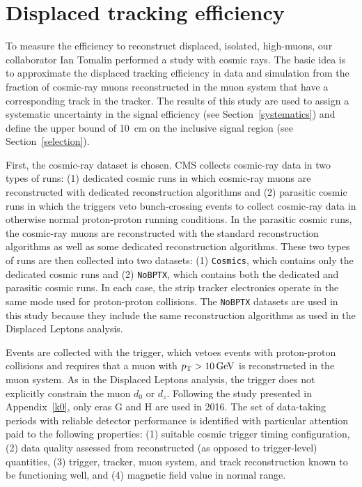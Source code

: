\chapter{Displaced tracking efficiency}
\label{displaced_tracking_eff}
To measure the efficiency to reconstruct displaced, isolated, high-\pt muons, our collaborator Ian Tomalin performed a study with cosmic rays. The basic idea is to approximate the displaced tracking efficiency in data and simulation from the fraction of cosmic-ray muons reconstructed in the muon system that have a corresponding track in the tracker. The results of this study are used to assign a systematic uncertainty in the signal efficiency (see Section~\ref{systematics}) and define the upper bound of \SI{10}{\cm} on the inclusive signal region (see Section~\ref{selection}).

First, the cosmic-ray dataset is chosen. CMS collects cosmic-ray data in two types of runs: (1) dedicated cosmic runs in which cosmic-ray muons are reconstructed with dedicated reconstruction algorithms and (2) parasitic cosmic runs in which the triggers veto bunch-crossing events to collect cosmic-ray data in otherwise normal proton-proton running conditions. In the parasitic cosmic runs, the cosmic-ray muons are reconstructed with the standard reconstruction algorithms as well as some dedicated reconstruction algorithms. These two types of runs are then collected into two datasets: (1) \texttt{Cosmics}, which contains only the dedicated cosmic runs and (2) \texttt{NoBPTX}, which contains both the dedicated and parasitic cosmic runs. In each case, the strip tracker electronics operate in the same mode used for proton-proton collisions. The \texttt{NoBPTX} datasets are used in this study because they include the same reconstruction algorithms as used in the Displaced Leptons analysis.

Events are collected with the  trigger, which vetoes events with proton-proton collisions and requires that a muon with $\pt>\SI{10}{\GeV}$ is reconstructed in the muon system. As in the Displaced Leptons analysis, the trigger does not explicitly constrain the muon $d_0$ or $d_z$. Following the study presented in Appendix~\ref{k0}, only eras G and H are used in 2016. The set of data-taking periods with reliable detector performance is identified with particular attention paid to the following properties: (1) suitable cosmic trigger timing configuration, (2) data quality assessed from reconstructed (as opposed to trigger-level) quantities, (3) trigger, tracker, muon system, and track reconstruction known to be functioning well, and (4) magnetic field value in normal range.

